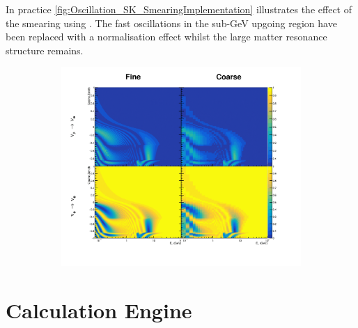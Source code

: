In practice \autoref{fig:Oscillation_SK_SmearingImplementation} illustrates the effect of the smearing using . The fast oscillations in the sub-GeV upgoing region have been replaced with a normalisation effect whilst the large matter resonance structure remains.

\begin{figure}[h]
  \begin{subfigure}[t]{\textwidth}
    \includegraphics[width=\textwidth, trim={0mm 0mm 0mm 0mm}, clip,page=1]{Figures/Oscillation/SmearingImplementation.pdf}
  \end{subfigure}
  \caption{}
  \label{fig:Oscillation_SK_SmearingImplementation}
\end{figure}

\clearpage

\section{Calculation Engine}
\label{sec:Oscillation_CalculationEngine}

